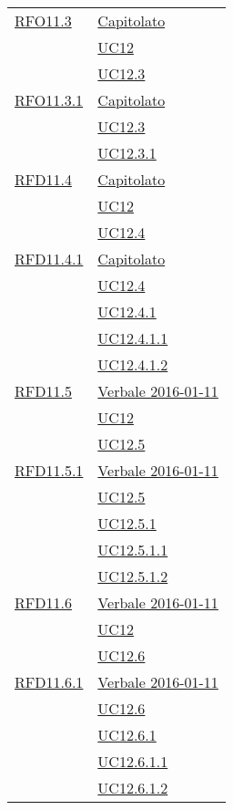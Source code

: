 \begin{longtable}{|>{\centering}m{5cm}|m{5cm}<{\centering}|}
\hyperlink{RFO11.3}{RFO11.3} & \hyperlink{Capitolato}{Capitolato}\\
& \hyperref[UC12]{UC12}\\
& \hyperref[UC12.3]{UC12.3}\\ \hline

\hyperlink{RFO11.3.1}{RFO11.3.1} & \hyperlink{Capitolato}{Capitolato}\\
& \hyperref[UC12.3]{UC12.3}\\
& \hyperref[UC12.3.1]{UC12.3.1}\\ \hline

\hyperlink{RFD11.4}{RFD11.4} & \hyperlink{Capitolato}{Capitolato}\\
& \hyperref[UC12]{UC12}\\
& \hyperref[UC12.4]{UC12.4}\\ \hline

\hyperlink{RFD11.4.1}{RFD11.4.1} & \hyperlink{Capitolato}{Capitolato}\\
& \hyperref[UC12.4]{UC12.4}\\
& \hyperref[UC12.4.1]{UC12.4.1}\\
& \hyperref[UC12.4.1.1]{UC12.4.1.1}\\
& \hyperref[UC12.4.1.2]{UC12.4.1.2}\\ \hline

\hyperlink{RFD11.5}{RFD11.5} & \hyperlink{Verbale 2016-01-11}{Verbale 2016-01-11}\\
& \hyperref[UC12]{UC12}\\
& \hyperref[UC12.5]{UC12.5}\\ \hline

\hyperlink{RFD11.5.1}{RFD11.5.1} & \hyperlink{Verbale 2016-01-11}{Verbale 2016-01-11}\\
& \hyperref[UC12.5]{UC12.5}\\
& \hyperref[UC12.5.1]{UC12.5.1}\\
& \hyperref[UC12.5.1.1]{UC12.5.1.1}\\
& \hyperref[UC12.5.1.2]{UC12.5.1.2}\\ \hline

\hyperlink{RFD11.6}{RFD11.6} & \hyperlink{Verbale 2016-01-11}{Verbale 2016-01-11}\\
& \hyperref[UC12]{UC12}\\
& \hyperref[UC12.6]{UC12.6}\\ \hline

\hyperlink{RFD11.6.1}{RFD11.6.1} & \hyperlink{Verbale 2016-01-11}{Verbale 2016-01-11}\\
& \hyperref[UC12.6]{UC12.6}\\
& \hyperref[UC12.6.1]{UC12.6.1}\\
& \hyperref[UC12.6.1.1]{UC12.6.1.1}\\
& \hyperref[UC12.6.1.2]{UC12.6.1.2}\\ \hline


\end{longtable}

